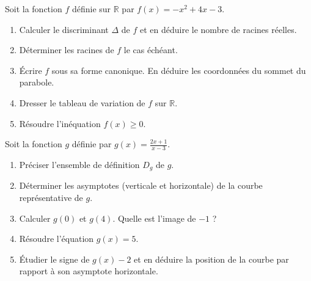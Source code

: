 \documentclass[11pt]{article}
\begin{document}
\begin{exercice}
Soit la fonction $f$ définie sur $\mathbb{R}$ par $f(x)= -x^2 + 4x - 3$.
\begin{enumerate}
    \item Calculer le discriminant $\Delta$ de $f$ et en déduire le nombre de racines réelles.
    \item Déterminer les racines de $f$ le cas échéant.
    \item Écrire $f$ sous sa forme canonique. En déduire les coordonnées du sommet du parabole.
    \item Dresser le tableau de variation de $f$ sur $\mathbb{R}$.
    \item Résoudre l'inéquation $f(x) \geq 0$.
\end{enumerate}
\end{exercice}

\begin{exercice}
Soit la fonction $g$ définie par $g(x)=\frac{2x+1}{x-3}$.
\begin{enumerate}
    \item Préciser l'ensemble de définition $D_g$ de $g$.
    \item Déterminer les asymptotes (verticale et horizontale) de la courbe représentative de $g$.
    \item Calculer $g(0)$ et $g(4)$. Quelle est l'image de $-1$ ?
    \item Résoudre l'équation $g(x)=5$.
    \item Étudier le signe de $g(x)-2$ et en déduire la position de la courbe par rapport à son asymptote horizontale.
\end{enumerate}
\end{exercice}
\end{document}
